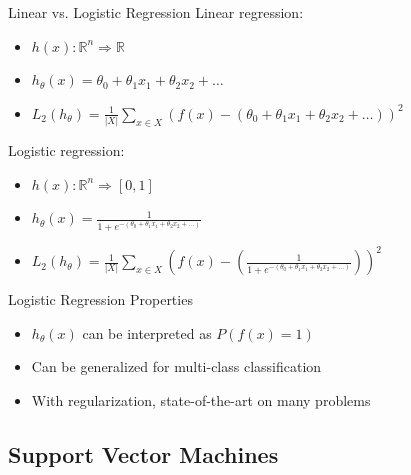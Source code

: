 \documentclass[14pt]{beamer}
\begin{document}
\begin{frame}[label=logistic-regression]{Linear vs. Logistic Regression}
Linear regression:
\begin{itemize}
\item $h(x): \mathbb{R}^n \Rightarrow \mathbb{R}$
\item $h_{\theta}(x) = \theta_0 + \theta_1 x_1 + \theta_2 x_2 + \ldots$
\item $\displaystyle L_2(h_{\theta}) = \frac{1}{|X|}\sum_{x \in X} \left(f(x) - \left( \theta_0 + \theta_1 x_1 + \theta_2 x_2 + \ldots \right)\right)^2$
\end{itemize}
\pause
Logistic regression:
\begin{itemize}
\item $h(x): \mathbb{R}^n \Rightarrow [0,1]$
\item $\displaystyle h_{\theta}(x) = \frac{1}{1 + e^{-(\theta_0 + \theta_1 x_1 + \theta_2 x_2 + \ldots)}}$
\item $\displaystyle L_2(h_{\theta}) = \frac{1}{|X|}\sum_{x \in X} \left(f(x) - \left( \frac{1}{1 + e^{-(\theta_0 + \theta_1 x_1 + \theta_2 x_2 + \ldots)}} \right)\right)^2$
\end{itemize}
\end{frame}

\begin{frame}[label=logistic-regression-properties]{Logistic Regression Properties}
\begin{itemize}
\item $h_{\theta}(x)$ can be interpreted as $P(f(x) = 1)$
\item Can be generalized for multi-class classification
\item With regularization, state-of-the-art on many problems
\end{itemize}
\end{frame}

\subsection{Support Vector Machines}
\end{document}

